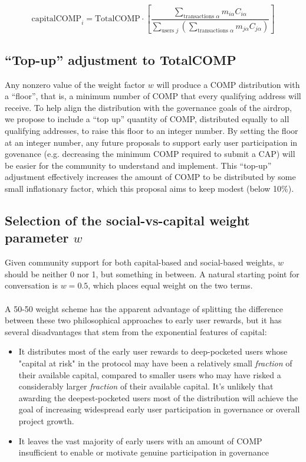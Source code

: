 \documentclass[12pt]{article}
\begin{document}
\begin{equation*}
  \mathrm{capitalCOMP}_i = \textrm{TotalCOMP}\cdot\left[\frac{\sum\limits_{\textrm{transactions }\alpha}{m_{i\alpha}C_{i\alpha}}}{\sum\limits_{\textrm{users }j}\left({\sum\limits_{\textrm{transactions }\alpha}{m_{j\alpha}C_{j\alpha}}}\right)}\right]
\end{equation*}

\subsection{``Top-up'' adjustment to \textrm{TotalCOMP}}

Any nonzero value of the weight factor $w$ will produce a COMP distribution with a ``floor'',
that is, a minimum number of COMP that every qualifying address will receive.
To help align the distribution with the governance goals of the airdrop,
we propose to include a ``top up'' quantity of COMP, distributed equally to all qualifying
addresses, to raise this floor to an integer number. By setting the floor at an integer 
number, any future proposals to support early user participation in govenance
(e.g. decreasing the minimum COMP required to submit a CAP) will be easier for the
community to understand and implement. This ``top-up'' adjustment effectively
increases the amount of COMP to be distributed by some small inflationary factor,
which this proposal aims to keep modest (below 10\%).

\subsection{Selection of the social-vs-capital weight parameter $w$}

Given community support for both capital-based and social-based weights,
$w$ should be neither 0 nor 1, but something in between. A natural starting
point for conversation is $w = 0.5$, which places equal weight on the two terms.
\\\\
A 50-50 weight scheme has the apparent advantage of splitting the difference
between these two philosophical approaches to early user rewards, but it has
several disadvantages that stem from the exponential features of capital:
\begin{itemize}
  \item{It distributes most of the early user rewards to deep-pocketed
        users whose "capital at risk" in the protocol may have been a
        relatively small {\em fraction} of their available capital,
        compared to smaller users who may have risked a considerably larger
        {\em fraction} of their available capital. It's unlikely that
        awarding the deepest-pocketed users most of the distribution will
        achieve the goal of increasing widespread early user participation
        in governance or overall project growth.}
  \item{It leaves the vast majority of early users with an amount of COMP
        insufficient to enable or motivate genuine participation in governance}
\end{itemize}
\end{document}
